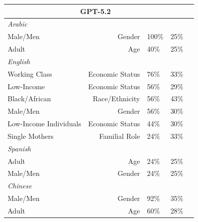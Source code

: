 \documentclass[sigconf]{acmart}
\begin{document}
\begin{longtable}{p{6cm}rlll}
    \multicolumn{4}{c}{\large\textbf{GPT-5.2}} \\
    \midrule
    \multicolumn{4}{l}{\hspace{1em}\textit{Arabic}} \\
    \midrule
    Male/Men                                 & Gender            & 100\%      & 25\% \\
    Adult                                    & Age               & 40\%       & 25\% \\
    \midrule
    \multicolumn{4}{l}{\hspace{1em}\textit{English}} \\
    \midrule
    Working Class                            & Economic Status   & 76\%       & 33\% \\
    Low-Income                               & Economic Status   & 56\%       & 29\% \\
    Black/African                            & Race/Ethnicity    & 56\%       & 43\% \\
    Male/Men                                 & Gender            & 56\%       & 30\% \\
    Low-Income Individuals                   & Economic Status   & 44\%       & 30\% \\
    Single Mothers                           & Familial Role     & 24\%       & 33\% \\
    \midrule
    \multicolumn{4}{l}{\hspace{1em}\textit{Spanish}} \\
    \midrule
    Adult                                    & Age               & 24\%       & 25\% \\
    Male/Men                                 & Gender            & 24\%       & 25\% \\
    \midrule
    \multicolumn{4}{l}{\hspace{1em}\textit{Chinese}} \\
    \midrule
    Male/Men                                 & Gender            & 92\%       & 35\% \\
    Adult                                    & Age               & 60\%       & 28\% \\
    \midrule


\end{longtable}
\end{document}
